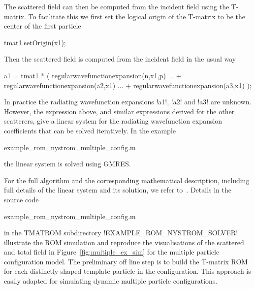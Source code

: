 \documentclass[12pt,letterpaper,final]{article}
\begin{document}
The scattered field can then be computed from the incident field
using the T-matrix.
To facilitate this we first set the logical origin of the T-matrix to
be the center of the first particle
\begin{matlab}
tmat{1}.setOrigin(x{1});
\end{matlab}
Then the scattered field is computed from the incident field in the usual
way
\begin{matlab}
a{1} = tmat{1} * ( regularwavefunctionexpansion(n,x{1},p) ...
       + regularwavefunctionexpansion(a{2},x{1}) ...
       + regularwavefunctionexpansion(a{3},x{1}) );
\end{matlab}

In practice the radiating wavefunction expansions !a{1}!, !a{2}! and !a{3}!
are unknown.
However, the expression above, and similar expressions derived for
the other scatterers, give a linear system for the radiating wavefunction
expansion coefficients that can be solved iteratively.
In the example
\begin{matlab}
example_rom_nystrom_multiple_config.m
\end{matlab}
the linear system is solved using GMRES.

For the full algorithm and the corresponding mathematical description,
including full details of the linear system and its solution, 
we refer to~\cite[Section 2.2]{gh:stoc_mult}. Details in the source code 
\begin{matlab}
example_rom_nystrom_multiple_config.m
\end{matlab}
in the TMATROM subdirectory !EXAMPLE_ROM_NYSTROM_SOLVER! 
illustrate the ROM simulation and reproduce the visualisations of the scattered and total field in
Figure~\ref{fig:multiple_ex_sim} for the multiple particle configuration model.
The preliminary off line step is to 
build the T-matrix ROM for each distinctly shaped template particle in the configuration. 
This approach
is easily adapted for simulating dynamic multiple particle configurations. 
\end{document}
